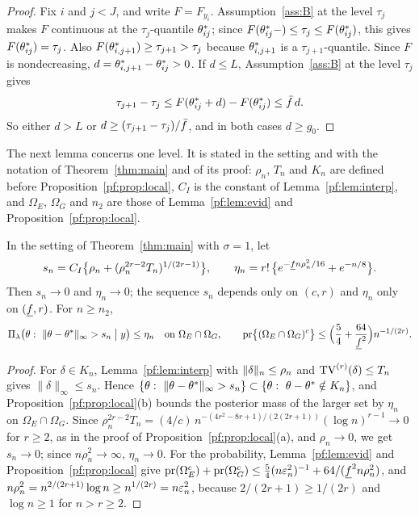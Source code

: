 \begin{proof}
Fix $i$ and $j<J$, and write $F=F_{y_i}$. Assumption~\ref{ass:B} at the level $\tau_j$ makes $F$ continuous at the $\tau_j$-quantile $\theta^{*}_{ij}$; since $F(\theta^{*}_{ij}-)\le\tau_j\le F(\theta^{*}_{ij})$, this gives $F(\theta^{*}_{ij})=\tau_j$. Also $F(\theta^{*}_{i,j+1})\ge\tau_{j+1}>\tau_j$ because $\theta^{*}_{i,j+1}$ is a $\tau_{j+1}$-quantile. Since $F$ is nondecreasing, $d=\theta^{*}_{i,j+1}-\theta^{*}_{ij}>0$. If $d\le L$, Assumption~\ref{ass:B} at the level $\tau_j$ gives
\[
\tau_{j+1}-\tau_j\le F(\theta^{*}_{ij}+d)-F(\theta^{*}_{ij})\le\bar f\,d .
\]
So either $d>L$ or $d\ge(\tau_{j+1}-\tau_j)/\bar f$, and in both cases $d\ge g_0$.
\end{proof}

The next lemma concerns one level. It is stated in the setting and with the notation of Theorem~\ref{thm:main} and of its proof: $\rho_n$, $T_n$ and $K_n$ are defined before Proposition~\ref{pf:prop:local}, $C_I$ is the constant of Lemma~\ref{pf:lem:interp}, and $\Omega_E$, $\Omega_G$ and $n_2$ are those of Lemma~\ref{pf:lem:evid} and Proposition~\ref{pf:prop:local}.

\begin{lemma}\label{pf:lem:sup}
In the setting of Theorem~\ref{thm:main} with $\sigma=1$, let
\[
s_n=C_I\bigl\{\rho_n+(\rho_n^{2r-2}T_n)^{1/(2r-1)}\bigr\},\qquad \eta_n=r!\,\bigl\{e^{-\underline f n\rho_n^2/16}+e^{-n/8}\bigr\}.
\]
Then $s_n\to0$ and $\eta_n\to0$; the sequence $s_n$ depends only on $(c,r)$ and $\eta_n$ only on $(\underline f,r)$. For $n\ge n_2$,
\[
\Pi_\lambda\bigl(\theta:\ \|\theta-\thetas\|_\infty>s_n\bigm|y\bigr)\le\eta_n\quad\text{on }\Omega_E\cap\Omega_G,
\qquad
\pr\bigl\{(\Omega_E\cap\Omega_G)^c\bigr\}\le\Bigl(\frac54+\frac{64}{\fl^2}\Bigr)n^{-1/(2r)} .
\]
\end{lemma}

\begin{proof}
For $\delta\in K_n$, Lemma~\ref{pf:lem:interp} with $\|\delta\|_n\le\rho_n$ and $\mathrm{TV}^{(r)}(\delta)\le T_n$ gives $\|\delta\|_\infty\le s_n$. Hence $\{\theta:\ \|\theta-\thetas\|_\infty>s_n\}\subset\{\theta:\ \theta-\thetas\notin K_n\}$, and Proposition~\ref{pf:prop:local}(b) bounds the posterior mass of the larger set by $\eta_n$ on $\Omega_E\cap\Omega_G$. Since $\rho_n^{2r-2}T_n=(4/c)\,n^{-(4r^2-8r+1)/(2(2r+1))}(\log n)^{r-1}\to0$ for $r\ge2$, as in the proof of Proposition~\ref{pf:prop:local}(a), and $\rho_n\to0$, we get $s_n\to0$; since $n\rho_n^2\to\infty$, $\eta_n\to0$. For the probability, Lemma~\ref{pf:lem:evid} and Proposition~\ref{pf:prop:local} give $\mathrm{pr}(\Omega_E^c)+\mathrm{pr}(\Omega_G^c)\le\tfrac54(n\varepsilon_n^2)^{-1}+64/(\underline f^2n\rho_n^2)$, and $n\rho_n^2=n^{2/(2r+1)}\log n\ge n^{1/(2r)}=n\varepsilon_n^2$, because $2/(2r+1)\ge1/(2r)$ and $\log n\ge1$ for $n>r\ge2$.
\end{proof}

